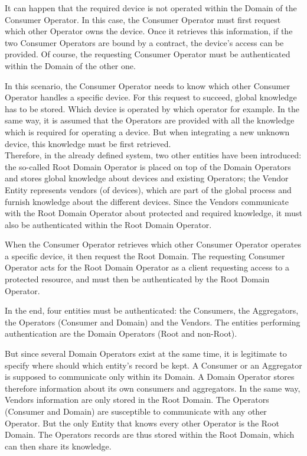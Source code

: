 It can happen that the required device is not operated within the Domain of the Consumer Operator. In this case, the Consumer Operator must first request which other Operator owns the device. Once it retrieves this information, if the two Consumer Operators are bound by a contract, the device's access can be provided. Of course, the requesting Consumer Operator must be authenticated within the Domain of the other one.

In this scenario, the Consumer Operator needs to know which other Consumer Operator handles a specific device. For this request to succeed, global knowledge has to be stored. Which device is operated by which operator for example. In the same way, it is assumed that the Operators are provided with all the knowledge which is required for operating a device. But when integrating a new unknown device, this knowledge must be first retrieved. \\Therefore, in the already defined system, two other entities have been introduced: the so-called Root Domain Operator is placed on top of the Domain Operators and stores global knowledge about devices and existing Operators; the Vendor Entity represents vendors (of devices), which are part of the global process and furnish knowledge about the different devices. Since the Vendors communicate with the Root Domain Operator about protected and required knowledge, it must also be authenticated within the Root Domain Operator. 

When the Consumer Operator retrieves which other Consumer Operator operates a specific device, it then request the Root Domain. The requesting Consumer Operator acts for the Root Domain Operator as a client requesting access to a protected resource, and must then be authenticated by the Root Domain Operator.

In the end, four entities must be authenticated: the Consumers, the Aggregators, the Operators (Consumer and Domain) and the Vendors. The entities performing authentication are the Domain Operators (Root and non-Root).

But since several Domain Operators exist at the same time, it is legitimate to specify where should which entity's record be kept. A Consumer or an Aggregator is supposed to communicate only within its Domain. A Domain Operator stores therefore information about its own consumers and aggregators. In the same way, Vendors information are only stored in the Root Domain. The Operators (Consumer and Domain) are susceptible to communicate with any other Operator. But the only Entity that knows every other Operator is the Root Domain. The Operators records are thus stored within the Root Domain, which can then share its knowledge.

